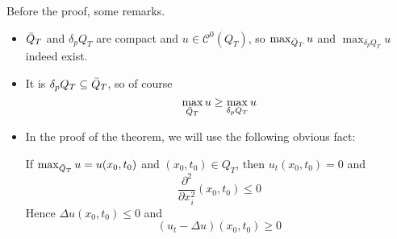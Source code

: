 Before the proof, some remarks.
\begin{remark}
    \begin{itemize}
        \item $\Bar{Q}_T$ and $\delta_p Q_T$ are compact and $u \in \mathcal{C}^0(Q_T)$, so $
        \max_{\Bar{Q}_T}u$ and $\max_{\delta_p Q_T} u$ indeed exist. 
        \item It is $\delta_p Q_T\subseteq \Bar{Q}_T$, so of course
        \begin{equation*}
            \max_{\Bar{Q}_T} u \geq \max_{\delta_p Q_T} u 
        \end{equation*}
        \item In the proof of the theorem, we will use the following obvious fact:
        \begin{PropBox}
            \begin{Proposition}
                If $\max_{\Bar{Q}_T} u = u(x_0,t_0)$ and $(x_0,t_0) \in Q_T$, then $u_t(x_0,t_0) = 0$ and
                \begin{equation*}
                    \frac{\partial^2}{\partial x_i^2} (x_0,t_0) \leq 0
                \end{equation*}
                Hence $\Delta u(x_0,t_0) \leq 0$ and 
                \begin{equation*}
                    (u_t-\Delta u)(x_0,t_0) \geq 0
                \end{equation*}
            \end{Proposition}
        \end{PropBox}
    \end{itemize}
\end{remark}

